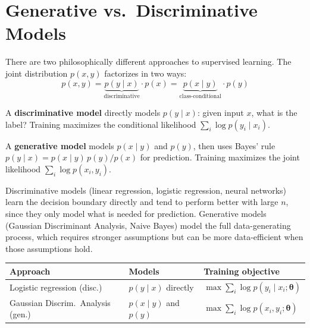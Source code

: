 \documentclass[main.tex]{subfiles}
\begin{document}
\needspace{0.33\textheight}
\section{Generative vs.\ Discriminative Models}

There are two philosophically different approaches to supervised learning. The joint distribution $p(x, y)$ factorizes in two ways:
$$p(x, y) = \underbrace{p(y \mid x)}_{\text{discriminative}} \cdot p(x) = \underbrace{p(x \mid y)}_{\text{class-conditional}} \cdot p(y)$$

\begin{definition}
A \textbf{discriminative model} directly models $p(y \mid x)$: given input $x$, what is the label? Training maximizes the conditional likelihood $\sum_i \log p(y_i \mid x_i)$.
\end{definition}

\begin{definition}
A \textbf{generative model} models $p(x \mid y)$ and $p(y)$, then uses Bayes' rule $p(y \mid x) = p(x \mid y)\,p(y)/p(x)$ for prediction. Training maximizes the joint likelihood $\sum_i \log p(x_i, y_i)$.
\end{definition}

Discriminative models (linear regression, logistic regression, neural networks) learn the decision boundary directly and tend to perform better with large $n$, since they only model what is needed for prediction. Generative models (Gaussian Discriminant Analysis, Naive Bayes) model the full data-generating process, which requires stronger assumptions but can be more data-efficient when those assumptions hold.

\begin{center}
\small
\begin{tabular}{lll}
\hline
\textbf{Approach} & \textbf{Models} & \textbf{Training objective} \\
\hline
Logistic regression (disc.) & $p(y \mid x)$ directly & $\max \sum_i \log p(y_i \mid x_i; \boldsymbol{\theta})$ \\
Gaussian Discrim.\ Analysis (gen.) & $p(x \mid y)$ and $p(y)$ & $\max \sum_i \log p(x_i, y_i; \boldsymbol{\theta})$ \\
\hline
\end{tabular}
\end{center}
\end{document}
